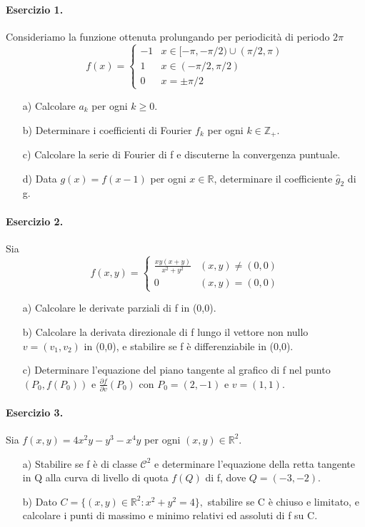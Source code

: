 \documentclass[a4paper, 10pt]{article}
\begin{document}
\paragraph{Esercizio 1.} Consideriamo la funzione ottenuta prolungando per periodicità di periodo $2\pi$
\[ f(x)=\begin{cases}-1 & x\in[-\pi,-\pi/2)\cup(\pi/2,\pi)\\ 1 & x\in(-\pi/2,\pi/2)\\ 0 & x=\pm\pi/2\end{cases} \]
\begin{enumerate}
    \item[a)] Calcolare $a_{k}$ per ogni $k\ge0$.
    \item[b)] Determinare i coefficienti di Fourier $f_{k}$ per ogni $k\in\mathbb{Z}_{+}$.
    \item[c)] Calcolare la serie di Fourier di f e discuterne la convergenza puntuale.
    \item[d)] Data $g(x)=f(x-1)$ per ogni $x\in\mathbb{R}$, determinare il coefficiente $\hat{g}_{2}$ di g.
\end{enumerate}

\paragraph{Esercizio 2.} Sia
\[ f(x,y)=\begin{cases}\frac{xy(x+y)}{x^{2}+y^{2}} & (x,y)\ne(0,0)\\ 0 & (x,y)=(0,0)\end{cases} \]
\begin{enumerate}
    \item[a)] Calcolare le derivate parziali di f in (0,0).
    \item[b)] Calcolare la derivata direzionale di f lungo il vettore non nullo $v=(v_{1},v_{2})$ in (0,0), e stabilire se f è differenziabile in (0,0).
    \item[c)] Determinare l'equazione del piano tangente al grafico di f nel punto $(P_{0},f(P_{0}))$ e $\frac{\partial f}{\partial v}(P_{0})$ con $P_{0}=(2,-1)$ e $v=(1,1)$.
\end{enumerate}

\paragraph{Esercizio 3.} Sia $f(x,y)=4x^{2}y-y^{3}-x^{4}y$ per ogni $(x,y)\in\mathbb{R}^{2}.$
\begin{enumerate}
    \item[a)] Stabilire se f è di classe $\mathcal{C}^{2}$ e determinare l'equazione della retta tangente in Q alla curva di livello di quota $f(Q)$ di f, dove $Q=(-3,-2)$.
    \item[b)] Dato $C=\{(x,y)\in\mathbb{R}^{2}:x^{2}+y^{2}=4\},$ stabilire se C è chiuso e limitato, e calcolare i punti di massimo e minimo relativi ed assoluti di f su C.
\end{enumerate}
\end{document}
